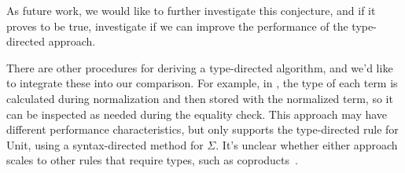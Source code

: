 As future work, we would like to further investigate this conjecture, and if it proves to be true, investigate if we can improve the performance of the type-directed approach.

There are other procedures for deriving a type-directed algorithm, and we'd like to integrate these into our comparison.
For example, in \citet{elabzoo}, the type of each term is calculated during normalization and then stored with the normalized term, so it can be inspected as needed during the equality check.
This approach may have different performance characteristics, but only supports the type-directed rule for Unit, using a syntax-directed method for $\Sigma$.
It's unclear whether either approach scales to other rules that require types, such as coproducts~\cite{altenkirch2001}.

% 
% 
% 


